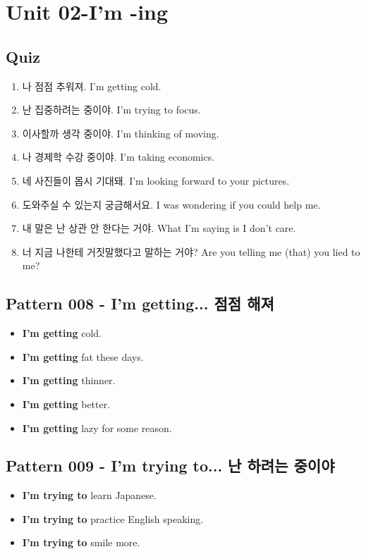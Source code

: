 \documentclass[11pt]{oblivoir}
\begin{document}
\section{Unit 02-I'm -ing}
\subsection{Quiz}
\begin{enumerate}
  \color{black} \item 나 점점 추워져. 
    \color{light-gray} I'm getting cold.
  \color{black} \item 난 집중하려는 중이야. 
    \color{light-gray} I'm trying to focus.
  \color{black} \item 이사할까 생각 중이야.
    \color{light-gray} I'm thinking of moving.
  \color{black} \item 나 경제학 수강 중이야.
    \color{light-gray} I'm taking economics.
  \color{black} \item 네 사진들이 몹시 기대돼.
    \color{light-gray} I'm looking forward to your pictures.
  \color{black} \item 도와주실 수 있는지 궁금해서요.
    \color{light-gray} I was wondering if you could help me.
  \color{black} \item 내 말은 난 상관 안 한다는 거야.
    \color{light-gray} What I'm saying is I don't care.
  \color{black} \item 너 지금 나한테 거짓말했다고 말하는 거야?
    \color{light-gray} Are you telling me (that) you lied to me?
\end{enumerate}


\subsection{Pattern 008 - I'm getting... 점점 \texttildelow 해져}
\begin{itemize}
  \item \textbf{I'm getting} cold.
  \item \textbf{I'm getting} fat these days.
  \item \textbf{I'm getting} thinner.
  \item \textbf{I'm getting} better.
  \item \textbf{I'm getting} lazy for some reason.
\end{itemize}

\subsection{Pattern 009 - I'm trying to... 난 \texttildelow 하려는 중이야}
\begin{itemize}
  \item \textbf{I'm trying to} learn Japanese.
  \item \textbf{I'm trying to} practice English speaking.
  \item \textbf{I'm trying to} smile more.
\end{itemize}
\end{document}
